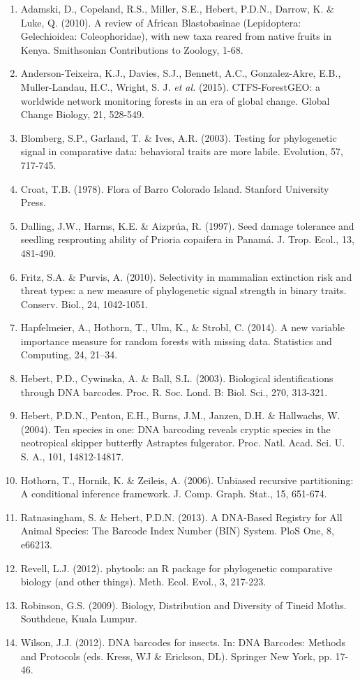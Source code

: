 \documentclass[11pt]{article}
\begin{document}
\begin{enumerate}
\item Adamski, D., Copeland, R.S., Miller, S.E., Hebert, P.D.N., Darrow, K. \& Luke, Q. (2010). A review of African Blastobasinae (Lepidoptera: Gelechioidea: Coleophoridae), with new taxa reared from native fruits in Kenya. Smithsonian Contributions to Zoology, 1-68.
\item Anderson-Teixeira, K.J., Davies, S.J., Bennett, A.C., Gonzalez-Akre, E.B., Muller-Landau, H.C., Wright, S. J. \emph{et al. }(2015). CTFS-ForestGEO: a worldwide network monitoring forests in an era of global change. Global Change Biology, 21, 528-549.
\item Blomberg, S.P., Garland, T. \& Ives, A.R. (2003). Testing for phylogenetic signal in comparative data: behavioral traits are more labile. Evolution, 57, 717-745.
\item Croat, T.B. (1978). Flora of Barro Colorado Island. Stanford University Press.
\item Dalling, J.W., Harms, K.E. \& Aizprúa, R. (1997). Seed damage tolerance and seedling resprouting ability of Prioria copaifera in Panamá. J. Trop. Ecol., 13, 481-490.
\item Fritz, S.A. \& Purvis, A. (2010). Selectivity in mammalian extinction risk and threat types: a new measure of phylogenetic signal strength in binary traits. Conserv. Biol., 24, 1042-1051.
\item Hapfelmeier, A., Hothorn, T., Ulm, K., \& Strobl, C. (2014). A new variable importance measure for random forests with missing data. Statistics and Computing, 24, 21–34.
\item Hebert, P.D., Cywinska, A. \& Ball, S.L. (2003). Biological identifications through DNA barcodes. Proc. R. Soc. Lond. B: Biol. Sci., 270, 313-321.
\item Hebert, P.D.N., Penton, E.H., Burns, J.M., Janzen, D.H. \& Hallwachs, W. (2004). Ten species in one: DNA barcoding reveals cryptic species in the neotropical skipper butterfly Astraptes fulgerator. Proc. Natl. Acad. Sci. U. S. A., 101, 14812-14817.
\item Hothorn, T., Hornik, K. \& Zeileis, A. (2006). Unbiased recursive partitioning: A conditional inference framework. J. Comp. Graph. Stat., 15, 651-674.
\item Ratnasingham, S. \& Hebert, P.D.N. (2013). A DNA-Based Registry for All Animal Species: The Barcode Index Number (BIN) System. PloS One, 8, e66213.
\item Revell, L.J. (2012). phytools: an R package for phylogenetic comparative biology (and other things). Meth. Ecol. Evol., 3, 217-223.
\item Robinson, G.S. (2009). Biology, Distribution and Diversity of Tineid Moths. Southdene, Kuala Lumpur.
\item Wilson, J.J. (2012). DNA barcodes for insects. In: DNA Barcodes: Methods and Protocols (eds. Kress, WJ \& Erickson, DL). Springer New York, pp. 17-46.
\end{enumerate}
\end{document}

